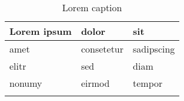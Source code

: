 ﻿\begin{longtable}[l]{|l|l|l|}
\hline
      Lorem ipsum
    & dolor
    & sit
\tabularnewline
\hline
      amet
    & consetetur
    & sadipscing
\\ \hline
      elitr
    & sed
    & diam
\tabularnewline
\hline
      nonumy
    & eirmod
    & tempor
\tabularnewline
\hline
\caption{Lorem caption}
\label{tab:}
\end{longtable}